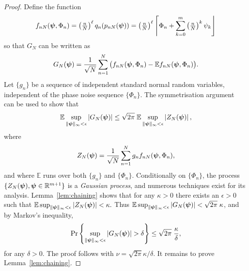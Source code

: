\documentclass[aap,preprint]{imsart}
\newcommand{\reals}{{\mathbb R}}
\newcommand{\prob}{\operatorname{Pr}}
\newcommand{\expect}{{\mathbb E}}
\newcommand{\abs}[1]{\left\vert #1 \right\vert}
\newcommand{\round}[1]{{\left\lceil #1 \right\rfloor}}
\newcommand{\cubr}[1]{{\left\{ #1 \right\}}}
\begin{document}
\begin{proof}
Define the function 
\begin{align*}
f_{nN}(\psibf, \Phi_n) = \left( \tfrac{n}{N}\right)^\ell q_n(p_{nN}(\psibf)) = \left( \tfrac{n}{N}\right)^\ell \round{\Phi_n + \sum_{k=0}^m\left( \tfrac{n}{N}\right)^k\psi_k}
\end{align*}
so that $G_N$ can be written as
\[
G_N(\psibf) = \frac{1}{\sqrt{N}} \sum_{n=1}^{N} \big( f_{nN}(\psibf, \Phi_n) - \expect f_{nN}(\psibf, \Phi_n) \big).
\]
Let $\{g_n\}$ be a sequence of independent standard normal random variables, independent of the phase noise sequence $\{\Phi_n\}$.  The symmetrisation argument~\cite[Sec.~4]{Pollard_asymp_empi_proc_1989}\cite{Gine_Zinn_symmetrisation_1984,van2009empirical} can be used to show that 
\[
\expect \sup_{\|\psibf\|_{\infty} < \epsilon} \abs{ G_N(\psibf)} \leq \sqrt{2\pi} \; \expect \sup_{\|\psibf\|_{\infty} < \epsilon}  \abs{ Z_N(\psibf) },
\]
where 
\begin{equation}\label{eq:ZpsiCondGaussProc}
Z_N(\psibf) = \frac{1}{\sqrt{N}} \sum_{n=1}^{N} g_n f_{nN}(\psibf, \Phi_n),
\end{equation}
and where $\expect$ runs over both $\{g_n\}$ and $\{\Phi_n\}$.  Conditionally on $\{\Phi_n\}$, the process $\{Z_N(\psibf), \psibf \in \reals^{m+1} \}$ is a \emph{Gaussian process}, and numerous techniques exist for its analysis.  Lemma~\ref{lem:chaining} shows that for any $\kappa > 0$ there exists an $\epsilon > 0$ such that $\expect \sup_{\|\psibf\|_{\infty} < \epsilon} \abs{ Z_N(\psibf) } < \kappa.$  Thus $\expect \sup_{\|\psibf\|_{\infty} < \epsilon} \abs{ G_N(\psibf)}  <  \sqrt{2\pi} \; \kappa$, and by Markov's inequality,
\[
\prob \cubr{  \sup_{\|\psibf\|_{\infty} < \epsilon} \abs{ G_N(\psibf)} > \delta } \leq  \sqrt{2\pi} \; \frac{\kappa}{\delta},
\]
for any $\delta > 0$.  The proof follows with $\nu =  \sqrt{2\pi} \kappa/\delta$.  It remains to prove Lemma~\ref{lem:chaining}.

\end{proof}

\end{document}
